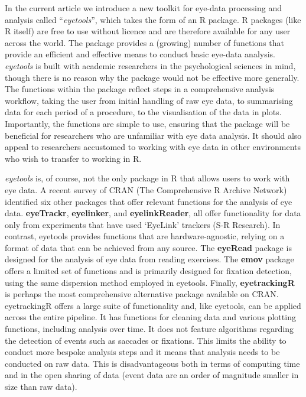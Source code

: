 \documentclass[
  man,
  floatsintext,
  longtable,
  nolmodern,
  notxfonts,
  notimes,
  colorlinks=true,linkcolor=blue,citecolor=blue,urlcolor=blue]{apa7}
\begin{document}
In the current article we introduce a new toolkit for eye-data
processing and analysis called ``\emph{eyetools}'', which takes the form
of an R package. R packages (like R itself) are free to use without
licence and are therefore available for any user across the world. The
package provides a (growing) number of functions that provide an
efficient and effective means to conduct basic eye-data analysis.
\emph{eyetools} is built with academic researchers in the psychological
sciences in mind, though there is no reason why the package would not be
effective more generally. The functions within the package reflect steps
in a comprehensive analysis workflow, taking the user from initial
handling of raw eye data, to summarising data for each period of a
procedure, to the visualisation of the data in plots. Importantly, the
functions are simple to use, ensuring that the package will be
beneficial for researchers who are unfamiliar with eye data analysis. It
should also appeal to researchers accustomed to working with eye data in
other environments who wish to transfer to working in R.

\emph{eyetools} is, of course, not the only package in R that allows
users to work with eye data. A recent survey of CRAN (The Comprehensive
R Archive Network) identified six other packages that offer relevant
functions for the analysis of eye data. \textbf{eyeTrackr},
\textbf{eyelinker}, and \textbf{eyelinkReader}, all offer functionality
for data only from experiments that have used `EyeLink' trackers (S-R
Research). In contrast, eyetools provides functions that are
hardware-agnostic, relying on a format of data that can be achieved from
any source. The \textbf{eyeRead} package is designed for the analysis of
eye data from reading exercises. The \textbf{emov} package offers a
limited set of functions and is primarily designed for fixation
detection, using the same dispersion method employed in eyetools.
Finally, \textbf{eyetrackingR} is perhaps the most comprehensive
alternative package available on CRAN. eyetrackingR offers a large suite
of functionality and, like eyetools, can be applied across the entire
pipeline. It has functions for cleaning data and various plotting
functions, including analysis over time. It does not feature algorithms
regarding the detection of events such as saccades or fixations. This
limits the ability to conduct more bespoke analysis steps and it means
that analysis needs to be conducted on raw data. This is disadvantageous
both in terms of computing time and in the open sharing of data (event
data are an order of magnitude smaller in size than raw data).
\end{document}
